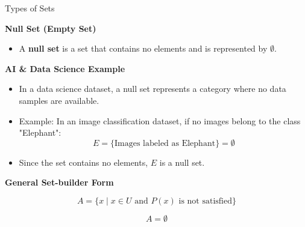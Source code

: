 \documentclass{beamer}
\begin{document}
\begin{frame}{Types of Sets}

\textbf{Null Set (Empty Set)}

\begin{itemize}
    \item A \textbf{null set} is a set that contains no elements and is represented by $\emptyset$.
\end{itemize}

\vspace{0.3cm}

\textbf{AI \& Data Science Example}

\begin{itemize}
    \item In a data science dataset, a null set represents a category where no data samples are available.
    \item Example: In an image classification dataset, if no images belong to the class "Elephant":
    \[
    E=\{\text{Images labeled as Elephant}\}=\emptyset
    \]
    \item Since the set contains no elements, \(E\) is a null set.
\end{itemize}

\vspace{0.3cm}

\textbf{General Set-builder Form}

\[
A=\{x \mid x\in U \text{ and } P(x)\text{ is not satisfied}\}
\]

\[
A=\emptyset
\]

\end{frame}
\end{document}
